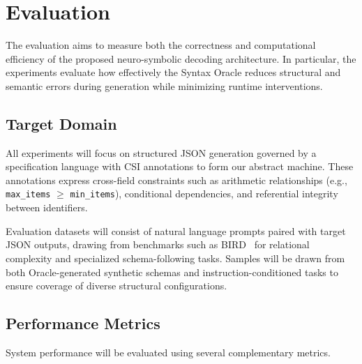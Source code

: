 \section{Evaluation}

The evaluation aims to measure both the correctness and
computational efficiency of the proposed neuro-symbolic decoding
architecture. In particular, the experiments evaluate how effectively the
Syntax Oracle reduces structural and semantic errors during generation while
minimizing runtime interventions.

\subsection{Target Domain}
All experiments will focus on structured JSON generation governed by
a specification language with CSI annotations to form our abstract machine.
These annotations express cross-field constraints such as arithmetic relationships (e.g.,
\texttt{max\_items} $\geq$ \texttt{min\_items}), conditional dependencies,
and referential integrity between identifiers.

Evaluation datasets will consist of natural language prompts paired with
target JSON outputs, drawing from benchmarks such as BIRD~\cite{li2023can} for relational 
complexity and specialized schema-following tasks. Samples will be drawn from both Oracle-generated
synthetic schemas and instruction-conditioned tasks to ensure coverage of
diverse structural configurations.

\subsection{Performance Metrics}
System performance will be evaluated using several complementary metrics.

